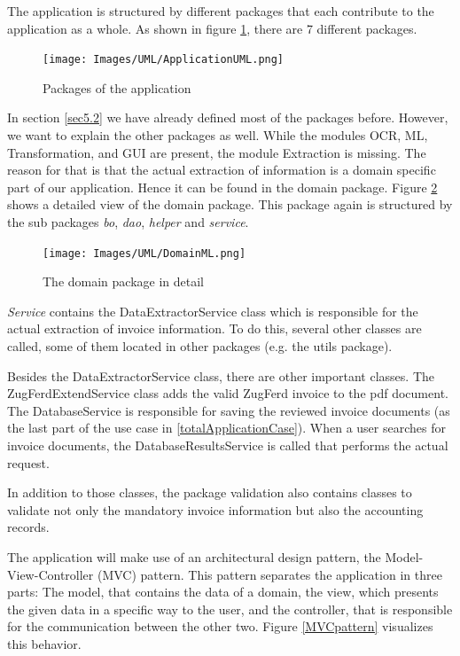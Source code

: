 The application is structured by different packages that each contribute to the application as a whole.
As shown in figure \ref{applicationUML}, there are 7 different packages. 

\begin{figure}[ht!]
\centering
\texttt{[image: Images/UML/ApplicationUML.png]}
\caption{Packages of the application \label{applicationUML}}
\end{figure}

In section \ref{sec5.2} we have already defined most of the packages before. However, we want to explain the other packages as well. While the modules OCR, ML, Transformation, and GUI are present, the module Extraction is missing. The reason for that is that the actual extraction of information is a domain specific part of our application. Hence it can be found in the domain package. Figure \ref{domainUML} shows a detailed view of the domain package. This package again is structured by the sub packages \emph{bo}, \emph{dao}, \emph{helper} and \emph{service}.

\begin{figure}[ht!]
\centering
%
\texttt{[image: Images/UML/DomainML.png]}
\caption{The domain package in detail \label{domainUML}}
\end{figure}

\emph{Service} contains the DataExtractorService class which is responsible for the actual extraction of invoice information. To do this, several other classes are called, some of them located in other packages (e.g. the utils package).

Besides the DataExtractorService class, there are other important classes. The ZugFerdExtendService class adds the valid ZugFerd invoice to the pdf document. The DatabaseService is responsible for saving the reviewed invoice documents (as the last part of the use case in \ref{totalApplicationCase}). When a user searches for invoice documents, the DatabaseResultsService is called that performs the actual request.

In addition to those classes, the package validation also contains classes to validate not only the mandatory invoice information but also the accounting records.

The application will make use of an architectural design pattern, the Model-View-Controller (MVC) pattern.
This pattern separates the application in three parts: The model, that contains the data of a domain, the view, which presents the given data in a specific way to the user, and the controller, that is responsible for the communication between the other two. Figure \ref{MVCpattern} visualizes this behavior.

